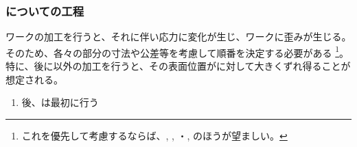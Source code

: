 \subsubsection{\DimpleMilling についての工程}
ワークの加工を行うと、それに伴い応力に変化が生じ、ワークに歪みが生じる。
そのため、各々の部分の寸法や公差等を考慮して順番を決定する必要がある
\footnote{これを優先して考慮するならば、\EndFacecutMilling, \OutcutMilling, \EndFaceOutCChamferMilling・\EndFaceInCChamferMilling, \KeywayMilling のほうが望ましい。}。
特に、\DimpleMeasurement 後に\Dimple 以外の加工を行うと、その表面位置が\DimpleDepth に対して大きくずれ得ることが想定される。
\begin{enumerate}[label={\sarrow}]
\item \DimpleMeasurement 後、\DimpleMilling は最初に行う
\end{enumerate}



